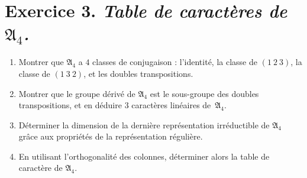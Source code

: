 \documentclass[./main]{subfiles}
\begin{document}
  \section{Exercice 3. \textit{Table de caractères de $\mathfrak{A}_4$.}}
  \begin{enonce}
    \begin{enumerate}
      \item Montrer que $\mathfrak{A}_4$ a  $4$ classes de conjugaison : l'identité, la classe de $(1\:2\:3)$, la classe de  $(1\:3\:2)$, et les doubles transpositions.
      \item Montrer que le groupe dérivé de  $\mathfrak{A}_4$ est le sous-groupe des doubles transpositions, et en déduire  $3$ caractères linéaires de~$\mathfrak{A}_4$. 
      \item Déterminer la dimension de la dernière représentation irréductible de $\mathfrak{A}_4$ grâce aux propriétés de la représentation régulière.
      \item En utilisant l'orthogonalité des colonnes, déterminer alors la table de caractère de $\mathfrak{A}_4$.
    \end{enumerate}
  \end{enonce}
\end{document}

